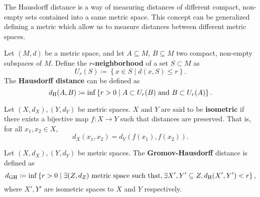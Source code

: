 The Hausdorff distance is a way of measuring distances of different compact, non-empty sets contained into a same metric space. This concept can be generalized defining a metric which allow us to measure distances between different metric spaces.

\begin{definition} \label{def:hausdorff-distance}
    Let $ (M, d) $ be a metric space, and let $ A \subseteq M $, $ B \subseteq M $ two compact, non-empty subspaces of $ M $. Define the {\bf $r$-neighborhood} of a set $ S \subset M $ as
    \begin{equation}
        U_r(S) \coloneq \left\{ x \in S \mid d(x, S) \leq r \right\}.
    \end{equation}
    The {\bf Hausdorff distance} can be defined as
    \begin{equation}
        d_{\operatorname{H}}(A, B) \coloneq \inf \left\{ r > 0 \mid A \subset U_r(B) \text{ and } B \subset U_r(A) \right\}.
    \end{equation}
\end{definition}

\begin{definition}
    Let $ (X, d_X), (Y, d_Y) $ be metric spaces. $ X $ and $ Y $ are said to be {\bf isometric} if there exists a bijective map $ f: X \to Y $ such that distances are preserved. That is, for all $ x_1, x_2 \in X $,
    $$
        d_X(x_1, x_2) = d_Y(f(x_1), f(x_2)).
    $$
\end{definition}

\begin{definition} \label{def:dgh}
    Let $ (X, d_X), (Y, d_Y) $ be metric spaces. The {\bf Gromov-Hausdorff} distance is defined as
    \begin{equation}
        d_{\operatorname{GH}} \coloneq \inf \left\{ r > 0 \mid \exists (Z, d_Z) \text{ metric space such that}, \exists X', Y' \subseteq Z, d_{\operatorname{H}}(X', Y') < r \right\},
    \end{equation}
    where $ X', Y' $ are isometric spaces to $ X $ and $ Y $ respectively.
\end{definition}

